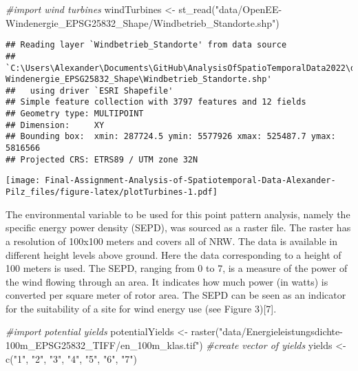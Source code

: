 \documentclass[
]{article}
\newenvironment{Shaded}{\begin{snugshade}}{\end{snugshade}}
\newcommand{\CommentTok}[1]{\textcolor[rgb]{0.56,0.35,0.01}{\textit{#1}}}
\newcommand{\FunctionTok}[1]{\textcolor[rgb]{0.00,0.00,0.00}{#1}}
\newcommand{\NormalTok}[1]{#1}
\newcommand{\OtherTok}[1]{\textcolor[rgb]{0.56,0.35,0.01}{#1}}
\newcommand{\StringTok}[1]{\textcolor[rgb]{0.31,0.60,0.02}{#1}}
\begin{document}
\begin{Shaded}
\begin{Highlighting}[]
\CommentTok{\#import wind turbines}
\NormalTok{windTurbines }\OtherTok{\textless{}{-}} \FunctionTok{st\_read}\NormalTok{(}\StringTok{"data/OpenEE{-}Windenergie\_EPSG25832\_Shape/Windbetrieb\_Standorte.shp"}\NormalTok{)}
\end{Highlighting}
\end{Shaded}

\begin{verbatim}
## Reading layer `Windbetrieb_Standorte' from data source 
##   `C:\Users\Alexander\Documents\GitHub\AnalysisOfSpatioTemporalData2022\data\OpenEE-Windenergie_EPSG25832_Shape\Windbetrieb_Standorte.shp' 
##   using driver `ESRI Shapefile'
## Simple feature collection with 3797 features and 12 fields
## Geometry type: MULTIPOINT
## Dimension:     XY
## Bounding box:  xmin: 287724.5 ymin: 5577926 xmax: 525487.7 ymax: 5816566
## Projected CRS: ETRS89 / UTM zone 32N
\end{verbatim}

\texttt{[image: Final-Assignment-Analysis-of-Spatiotemporal-Data-Alexander-Pilz\_files/figure-latex/plotTurbines-1.pdf]}

The environmental variable to be used for this point pattern analysis,
namely the specific energy power density (SEPD), was sourced as a raster
file. The raster has a resolution of 100x100 meters and covers all of
NRW. The data is available in different height levels above ground. Here
the data corresponding to a height of 100 meters is used. The SEPD,
ranging from 0 to 7, is a measure of the power of the wind flowing
through an area. It indicates how much power (in watts) is converted per
square meter of rotor area. The SEPD can be seen as an indicator for the
suitability of a site for wind energy use (see Figure 3){[}7{]}.

\begin{Shaded}
\begin{Highlighting}[]
\CommentTok{\#import potential yields}
\NormalTok{potentialYields }\OtherTok{\textless{}{-}} \FunctionTok{raster}\NormalTok{(}\StringTok{"data/Energieleistungsdichte{-}100m\_EPSG25832\_TIFF/en\_100m\_klas.tif"}\NormalTok{)}
\CommentTok{\#create vector of yields}
\NormalTok{yields }\OtherTok{\textless{}{-}} \FunctionTok{c}\NormalTok{(}\StringTok{"1"}\NormalTok{, }\StringTok{"2"}\NormalTok{, }\StringTok{"3"}\NormalTok{, }\StringTok{"4"}\NormalTok{, }\StringTok{"5"}\NormalTok{, }\StringTok{"6"}\NormalTok{, }\StringTok{"7"}\NormalTok{)}
\end{Highlighting}
\end{Shaded}
\end{document}
